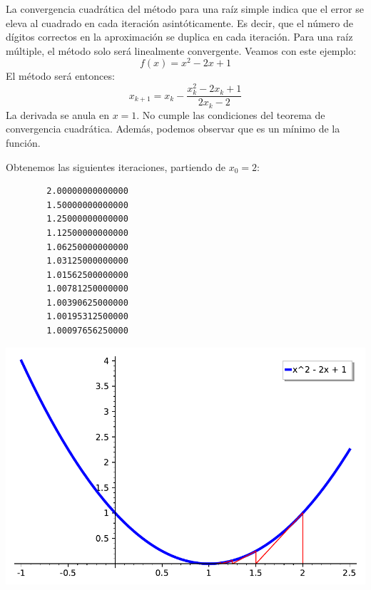 \begin{example}
La convergencia cuadrática del método para una raíz simple indica que el error se eleva al cuadrado en cada iteración asintóticamente. Es decir, que el número de dígitos correctos en la aproximación se duplica en cada iteración. Para una raíz múltiple, el método solo será linealmente convergente. Veamos con este ejemplo: $$f(x) = x^2 - 2x + 1$$
El método será entonces: $$x_{k+1} = x_{k} - \frac{ x_k^2 -2x_k + 1}{2x_k-2}$$
La derivada se anula en $x = 1$. No cumple las condiciones del teorema de convergencia cuadrática. Además, podemos observar que es un mínimo de la función.

Obtenemos las siguientes iteraciones, partiendo de $x_0 = 2$:
	\begin{verbatim}
		2.00000000000000
		1.50000000000000
		1.25000000000000
		1.12500000000000
		1.06250000000000
		1.03125000000000
		1.01562500000000
		1.00781250000000
		1.00390625000000
		1.00195312500000
		1.00097656250000
	\end{verbatim}

\begin{center}
	\includegraphics[scale=1]{imagenes/ejemplo2_newton.pdf}
\end{center}
	
\end{example}

